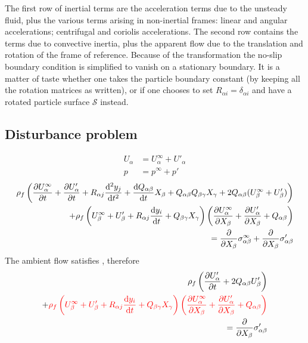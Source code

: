 \documentclass[thesis.tex]{subfiles}
\begin{document}
The first row of inertial terms are the acceleration terms due to the unsteady fluid, plus the various terms arising in non-inertial frames: linear and angular accelerations; centrifugal and coriolis accelerations. The second row contains the terms due to convective inertia, plus the apparent flow due to the translation and rotation of the frame of reference. Because of the transformation the no-slip boundary condition is simplified to vanish on a stationary boundary. It is a matter of taste whether one takes the particle boundary constant (by keeping all the rotation matrices as written), or if one chooses to set $R_{\alpha i} = \delta_{\alpha i}$ and have a rotated particle surface $\mathcal S$ instead.
\subsection{Disturbance problem}
\begin{align}
	U_\alpha &= U^\infty_\alpha + U'_\alpha \\
	p &= p^\infty + p'
\end{align}
\begin{align}
	\rho_f \left(\frac{\partial U^\infty_\alpha}{\partial t}+\frac{\partial U'_\alpha}{\partial t} + R_{\alpha j}\frac{\mathrm{d}^2y_j}{\mathrm{d} t^2} + \frac{\mathrm{d} Q_{\alpha \beta}}{\mathrm{d} t}X_\beta + Q_{\alpha \beta}Q_{\beta \gamma}X_\gamma + 2Q_{\alpha \beta}(U^\infty_\beta+U'_\beta) \right) \nonumber \\
	+ \rho_f \left(U^\infty_\beta + U'_\beta + R_{\alpha j}\frac{\mathrm{d} y_i}{\mathrm{d} t}+Q_{\beta \gamma}X_\gamma\right)\left(\frac{\partial U^\infty_\alpha}{\partial X_\beta}+\frac{\partial U'_\alpha}{\partial X_\beta}+Q_{\alpha \beta}\right) \nonumber \\
	= \frac{\partial }{\partial X_\beta} \sigma^\infty_{\alpha \beta} + \frac{\partial }{\partial X_\beta} \sigma'_{\alpha \beta}
\end{align}
The ambient flow satisfies , therefore
\begin{align}
	\rho_f \left(\frac{\partial U'_\alpha}{\partial t} + 2Q_{\alpha \beta}U'_\beta \right) \nonumber \\
	+ \color{red}{\rho_f \left(U^\infty_\beta + U'_\beta + R_{\alpha j}\frac{\ensuremath{\mathrm{d}}y_i}{\ensuremath{\mathrm{d}}t}+Q_{\beta \gamma}X_\gamma\right)\left(\frac{\partial U^\infty_\alpha}{\partial X_\beta}+\frac{\partial U'_\alpha}{\partial X_\beta}+Q_{\alpha \beta}\right)} \nonumber \\
	= \frac{\partial }{\partial X_\beta} \sigma'_{\alpha \beta}
\end{align}
\end{document}
